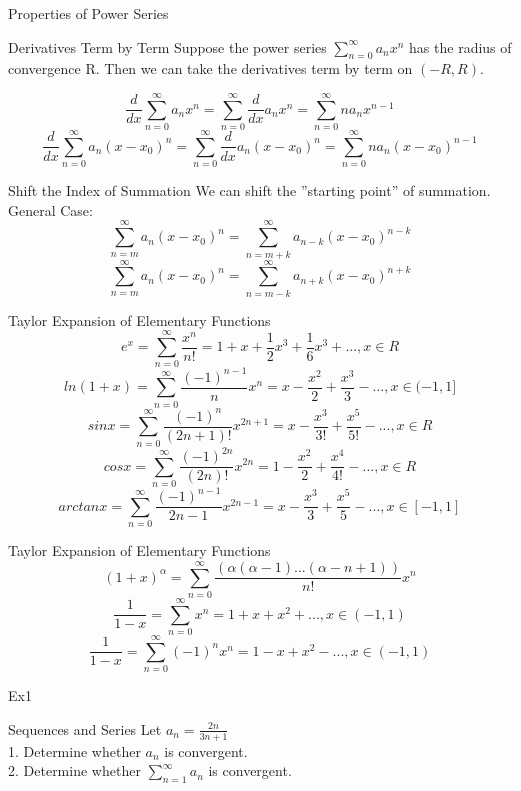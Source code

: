 \documentclass{beamer}
\begin{document}
\begin{frame}{Properties of Power Series}
    \begin{block}{ Derivatives Term by Term}
    Suppose the power series $\sum_{n=0}^{\infty}a_n x^n$ has the radius of convergence R. Then we can take the derivatives term by term on $(−R,R)$.
    \end{block}
    $$\frac{d}{dx}\sum\limits_{n=0}^{\infty}a_n x^n = \sum\limits_{n=0}^{\infty} \frac{d}{dx} a_n x^n = \sum\limits_{n=0}^{\infty} n a_n x^{n-1}$$
    $$\frac{d}{dx}\sum\limits_{n=0}^{\infty}a_n (x-x_0)^n = \sum\limits_{n=0}^{\infty} \frac{d}{dx} a_n (x-x_0)^n = \sum\limits_{n=0}^{\infty} n a_n (x-x_0)^{n-1}$$
\end{frame}
\begin{frame}{Shift the Index of Summation}
   We can shift the ”starting point” of summation. General Case:
   $$\sum\limits_{n=m}^{\infty} a_n (x-x_0)^n = \sum\limits_{n=m+k}^{\infty} a_{n-k} (x-x_0)^{n-k}$$
   $$\sum\limits_{n=m}^{\infty} a_n (x-x_0)^n = \sum\limits_{n=m-k}^{\infty} a_{n+k} (x-x_0)^{n+k}$$
\end{frame}
\begin{frame}{Taylor Expansion of Elementary Functions}
    $$e^x = \sum\limits_{n=0}^{\infty} \frac{x^n}{n!}=1+x+\frac{1}{2}x^3+\frac{1}{6}x^3+...,x \in R$$
    $$ln(1+x)=\sum\limits_{n=0}^{\infty}\frac{(-1)^{n-1}}{n}x^n = x-\frac{x^2}{2}+\frac{x^3}{3}-..., x \in (-1,1]$$
    $$sin x =\sum\limits_{n=0}^{\infty} \frac{(-1)^{n}}{(2n+1)!} x^{2n+1}=x -\frac{x^3}{3!} +\frac{x^5}{5!}-...,x\in R$$
    $$cos x =\sum\limits_{n=0}^{\infty} \frac{(-1)^{2n}}{(2n)!}x^{2n} = 1 - \frac{x^2}{2}+ \frac{x^4}{4!}-...,x\in R$$
    $$arctan x =\sum\limits_{n=0}^{\infty} \frac{(-1)^{n-1}}{2n-1}x^{2n-1} =x -\frac{x^3}{3}+\frac{x^5}{5}-..., x\in [-1,1]$$
\end{frame}
\begin{frame}{Taylor Expansion of Elementary Functions}
    $$(1+x)^\alpha = \sum\limits_{n=0}^{\infty} \frac{(\alpha(\alpha-1)...(\alpha-n+1))}{n!} x^n$$
    $$\frac{1}{1-x}=\sum\limits_{n=0}^{\infty} x^n = 1+x+x^2+...,x\in (-1,1)$$
    $$\frac{1}{1-x}=\sum\limits_{n=0}^{\infty} (-1)^n x^n = 1-x+x^2-...,x\in (-1,1)$$
\end{frame}

\begin{frame}{Ex1}
    \begin{block}{Sequences and Series}
        Let $a_n=\frac{2n}{3n+1}$\\
        1. Determine whether {$a_n$} is convergent.\\
        2. Determine whether $\sum_{n=1}^{\infty} a_n$ is convergent.
    \end{block}
\end{frame}
\end{document}
